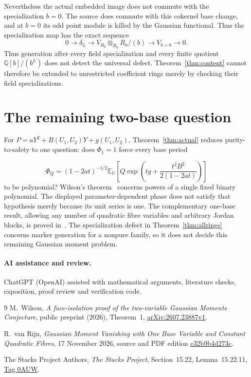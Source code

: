 \documentclass[11pt]{article}
\theoremstyle{definition}\newtheorem{definition}[theorem]{Definition}
\theoremstyle{remark}\newtheorem{remark}[theorem]{Remark}
\newcommand{\E}{\mathbb E}
\begin{document}
Nevertheless the actual embedded image does not commute with
the specialization $b=0$. The source does commute with this
cokernel base change, and at $b=0$ its odd point module is killed
by the Gaussian functional. Thus the specialization map has
the exact sequence
\[
 0\longrightarrow\delta_{\mathbb Q}
 \longrightarrow V_{R_0}\otimes_{R_0}R_0/(b)
 \longrightarrow V_{b=0}\longrightarrow0.
\]
Thus generation after every field specialization and every finite
quotient $\mathbb Q[b]/(b^L)$ does not detect the universal defect.
Theorem~\ref{thm:content} cannot therefore be extended to unrestricted
coefficient rings merely by checking their field specializations.


\section{The remaining two-base question}

For $P=aY^2+B(U_1,U_2)Y+g(U_1,U_2)$, Theorem~\ref{thm:actual}
reduces purity-to-safety to one question: does $\Phi_1=1$ force
every base period

\[
 \Phi_Q=(1-2at)^{-1/2}\E_U\!\left[
 Q\exp\!\left(tg+\frac{t^2B^2}{2(1-2at)}\right)\right]
\]
to be polynomial? Wilson's theorem~\cite{Wilson} concerns powers of a single fixed
binary polynomial. The displayed parameter-dependent phase does
not satisfy that hypothesis merely because its unit series is one.
The complementary one-base result, allowing any number of quadratic
fibre variables and arbitrary Jordan blocks, is proved in~\cite{Jordan}.
The specialization defect in Theorem~\ref{thm:allrings} concerns
marker generation for a nonpure family, so it does not decide this
remaining Gaussian moment problem.

\paragraph{AI assistance and review.}
ChatGPT (OpenAI) assisted with mathematical arguments, literature checks,
exposition, proof review and verification code.

\begin{thebibliography}{9}
M.~Wilson, \emph{A face-isolation proof of the two-variable Gaussian
Moments Conjecture}, public preprint (2026), Theorem~1,
\href{https://arxiv.org/abs/2607.23887v1}{arXiv:2607.23887v1}.

R.~van Rijn, \emph{Gaussian Moment Vanishing with One Base Variable and
Constant Quadratic Fibres}, 17 November 2026, source and PDF edition
\href{https://github.com/royvanrijn/jacobian-research/tree/c32b9b4d273cf7988e85184a0d5eae9c488727fd/unpublished/gaussian-quadratic-fibre-jordan-cancellation}{c32b9b4d273c}.

The Stacks Project Authors, \emph{The Stacks Project},
Section~15.22, Lemma~15.22.11,
\href{https://stacks.math.columbia.edu/tag/0AUW}{Tag 0AUW}.
\end{thebibliography}
\end{document}
